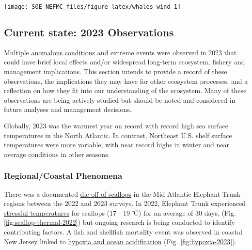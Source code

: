\documentclass[
  10pt,
]{article}
\let\origfigure\figure
\let\endorigfigure\endfigure
\renewenvironment{figure}[1][2] {
    \expandafter\origfigure\expandafter[H]
} {
    \endorigfigure
}
\begin{document}
\begin{figure}

{\centering \texttt{[image: SOE-NEFMC\_files/figure-latex/whales-wind-1]} 

}

\caption{Northern Right Whale persistent hotspots and Wind Energy Areas.}\label{fig:whales-wind}
\end{figure}
\newpage

\hypertarget{current-state-2023-observations}{%
\subsection{Current state: 2023 Observations}\label{current-state-2023-observations}}

Multiple \href{https://noaa-edab.github.io/catalog/observation-synthesis.html}{anomalous conditions} and extreme events were observed in 2023 that could have brief local effects and/or widespread long-term ecosystem, fishery and management implications. This section intends to provide a record of these observations, the implications they may have for other ecosystem processes, and a reflection on how they fit into our understanding of the ecosystem. Many of these observations are being actively studied but should be noted and considered in future analyses and management decisions.

Globally, 2023 was the warmest year on record with record high sea surface temperatures in the North Atlantic. In contrast, Northeast U.S. shelf surface temperatures were more variable, with near record highs in winter and near average conditions in other seasons.

\hypertarget{regionalcoastal-phenomena}{%
\subsubsection{Regional/Coastal Phenomena}\label{regionalcoastal-phenomena}}

There was a documented \href{https://noaa-edab.github.io/catalog/observation-synthesis.html}{die-off of scallops} in the Mid-Atlantic Elephant Trunk regions between the 2022 and 2023 surveys. In 2022, Elephant Trunk experienced \href{https://noaa-edab.github.io/catalog/thermal-habitat-persistence.html}{stressful temperatures} for scallops (17 - 19 ℃) for an average of 30 days, (Fig. \ref{fig:scallop-thermal-2022}) but ongoing research is being conducted to identify contributing factors. A fish and shellfish mortality event was observed in coastal New Jersey linked to \href{https://noaa-edab.github.io/catalog/ocean-acidification-and-other-stressors.html}{hypoxia and ocean acidification} (Fig. \ref{fig:hypoxia-2023}).
\end{document}
